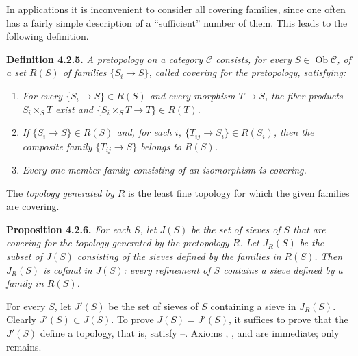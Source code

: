 In applications it is inconvenient to consider all covering families, since
one often has a fairly simple description of a ``sufficient'' number of
them. This leads to the following definition.

\medskip
\noindent{}\textbf{Definition 4.2.5.}
\textit{A \emph{pretopology} on a category \(\mathscr C\) consists, for
every \(S\in\operatorname{Ob}\mathscr C\), of a set \(R(S)\) of
families \(\{S_i\to S\}\), called \emph{covering for the pretopology},
satisfying:}
\begin{enumerate}
 \item[(P 1)] \textit{For every \(\{S_i\to S\}\in R(S)\) and
 every morphism \(T\to S\), the fiber products \(S_i\times_ST\) exist and
 \(\{S_i\times_ST\to T\}\in R(T)\).}
 \item[(P 2)] \textit{If \(\{S_i\to S\}\in R(S)\) and, for each
 \(i\), \(\{T_{ij}\to S_i\}\in R(S_i)\), then the composite
 family \(\{T_{ij}\to S\}\) belongs to \(R(S)\).}
 \item[(P 3)] \textit{Every one-member family consisting of an isomorphism
 is covering.}
\end{enumerate}
The \emph{topology generated by \(R\)} is the least fine topology for which
the given families are covering.

\medskip
\noindent{}\textbf{Proposition 4.2.6.}
\textit{For each \(S\), let \(J(S)\) be the set of sieves of \(S\) that
are covering for the topology generated by the pretopology \(R\).
Let \(J_R(S)\) be the subset of \(J(S)\) consisting of the
sieves defined by the families in \(R(S)\). Then
\(J_R(S)\) is cofinal in \(J(S)\): every refinement of \(S\)
contains a sieve defined by a family in \(R(S)\).}

For every \(S\), let \(J'(S)\) be the set of sieves of \(S\) containing a
sieve in \(J_R(S)\). Clearly \(J'(S)\subset J(S)\). To prove
\(J(S)=J'(S)\), it suffices to prove that the \(J'(S)\) define a topology,
that is, satisfy --. Axioms , , and  are immediate;
only  remains.

